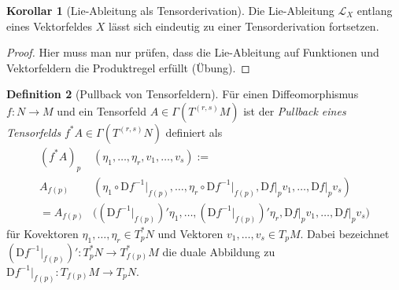 \documentclass[a4paper]{scrbook}
\numberwithin{equation}{chapter}
\newcommand{\DD}{\mathrm{D}}
\theoremstyle{definition}
\newtheorem{defn}{Definition}[section]
\newtheorem{kor}[defn]{Korollar}
\begin{document}
		\begin{kor}[Lie-Ableitung als Tensorderivation]
			Die Lie-Ableitung $\mathcal{L}_X$ entlang eines Vektorfeldes $X$ lässt sich eindeutig zu einer Tensorderivation fortsetzen.
			\begin{proof}
				Hier muss man nur prüfen, dass die Lie-Ableitung auf Funktionen und Vektorfeldern die Produktregel erfüllt (Übung).
			\end{proof}
		\end{kor}
		
		\begin{defn}[Pullback von Tensorfeldern]
			Für einen Diffeomorphismus $f\colon N\rightarrow M$ und ein Tensorfeld $A\in \Gamma(T^{(r,s)}M)$ ist der \emph{Pullback eines Tensorfelds} $f^*A\in\Gamma(T^{(r,s)}N)$ definiert als
			\begin{align*}
				(f^*A)_p&(\eta_1,\ldots,\eta_r,v_1,\ldots,v_s):=\\
				A_{f(p)}&(\eta_1\circ\DD f^{-1}\vert_{f(p)},\ldots,\eta_r\circ\DD f^{-1}\vert_{f(p)},\DD f\vert_pv_1,\ldots,\DD f\vert_pv_s)\\
				= A_{f(p)}& \Big((\DD f^{-1}\vert_{f(p)})' \eta_1, \ldots, (\DD f^{-1}\vert_{f(p)})' \eta_r, \DD f\vert_pv_1,\ldots,\DD f\vert_pv_s \Big)
			\end{align*}
			für Kovektoren $\eta_1,\dots,\eta_r \in T_p^*N$ und Vektoren $v_1,\dots,v_s \in T_pM$. Dabei bezeichnet $(\DD f^{-1}\vert_{f(p)})' \colon T_p^*N \to T_{f(p)}^*M$ die duale Abbildung zu $\DD f^{-1}\vert_{f(p)}\colon T_{f(p)}M \to T_pN$.
		\end{defn}
		
\end{document}
